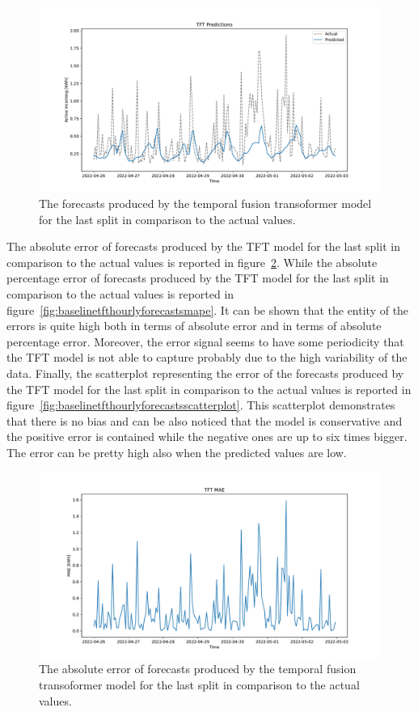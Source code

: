 \begin{figure}[H]
\centering
\includegraphics[width=1\textwidth]{images/baseline/TFT}
\caption{The forecasts produced by the temporal fusion transoformer model for the last split in comparison to the actual values.}
\label{fig:baselinetfthourlyforecasts}
\end{figure}

The absolute error of forecasts produced by the TFT model for the last split in comparison to the actual values is reported in figure~\ref{fig:baselinetfthourlyforecastsmae}.
While the absolute percentage error of forecasts produced by the TFT model for the last split in comparison to the actual values is reported in figure~\ref{fig:baselinetfthourlyforecastsmape}.
It can be shown that the entity of the errors is quite high both in terms of absolute error and in terms of absolute percentage error.
Moreover, the error signal seems to have some periodicity that the TFT model is not able to capture probably due to the high variability of the data.
Finally, the scatterplot representing the error of the forecasts produced by the TFT model for the last split in comparison to the actual values is reported in figure~\ref{fig:baselinetfthourlyforecastsscatterplot}.
This scatterplot demonstrates that there is no bias and can be also noticed that the model is conservative and the positive error is contained while the negative ones are up to six times bigger.
The error can be pretty high also when the predicted values are low.

\begin{figure}[H]
\centering
\includegraphics[width=1\textwidth]{images/baseline/TFT_mae}
\caption{The absolute error of forecasts produced by the temporal fusion transoformer model for the last split in comparison to the actual values.}
\label{fig:baselinetfthourlyforecastsmae}
\end{figure}

